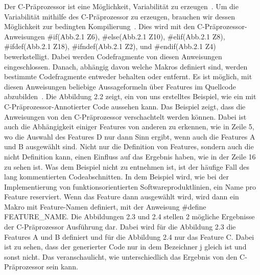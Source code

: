 Der C-Präprozessor ist eine Möglichkeit, Variabilität zu erzeugen~\cite{ABKS13}. Um die Variabilität mithilfe des C-Präprozessor zu erzeugen, brauchen wir dessen Möglichkeit zur bedingten Kompilierung~\cite{ABKS13}. Dies wird mit den C-Präprozessor-Anweisungen \#if(Abb.2.1 Z6), \#else(Abb.2.1 Z10), \#elif(Abb.2.1 Z8), \#ifdef(Abb.2.1 Z18), \#ifndef(Abb.2.1 Z2), und \#endif(Abb.2.1 Z4) bewerkstelligt. Dabei werden Codefragmente von diesen Anweisungen eingeschlossen. Danach, abhängig davon welche Makros definiert sind, werden bestimmte Codefragmente entweder behalten oder entfernt. Es ist möglich, mit diesen Anweisungen  beliebige Aussageformeln über Features im Quellcode abzubilden~\cite{BTS+:ESECFSE22}. 
Die Abbildung 2.2 zeigt, ein von uns erstelltes Beispiel, wie ein mit C-Präprozessor-Annotierter Code aussehen kann. Das Beispiel zeigt, dass die Anweisungen von den C-Präprozessor verschachtelt werden können. Dabei ist auch die Abhängigkeit einiger Features von anderen zu erkennen, wie in Zeile 5, wo die Auswahl des Features D nur dann Sinn ergibt, wenn auch die Features A und B ausgewählt sind. Nicht nur die Definition von Features, sondern auch die nicht Definition kann, einen Einfluss auf das Ergebnis haben, wie in der Zeile 16 zu sehen ist. Was dem Beispiel nicht zu entnehmen ist, ist der häufige Fall des lang kommentierten Codeabschnitten.  In dem Beispiel wird, wie bei der Implementierung von funktionsorientierten Softwareproduktlinien, ein Name pro Feature reserviert. Wenn das Feature dann ausgewählt wird, wird dann ein Makro mit Feature-Namen definiert, mit der Anweisung \#define FEATURE\_NAME. Die Abbildungen 2.3 und 2.4 stellen 2 mögliche Ergebnisse der C-Präprozessor Ausführung dar. Dabei wird für die Abbildung 2.3 die Features A und B definiert und für die Abbildung 2.4 nur das Feature C. Dabei ist zu sehen, dass der generierter Code nur in dem Bezeichner j gleich ist und sonst nicht. Das veranschaulicht, wie unterschiedlich das Ergebnis von den C-Präprozessor sein kann.
